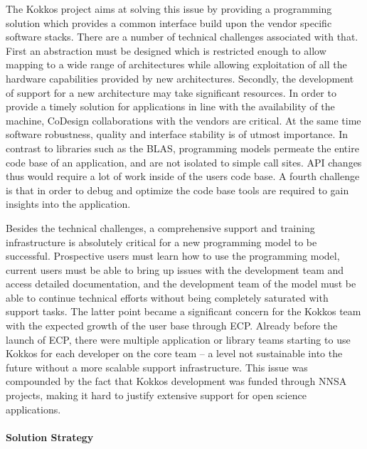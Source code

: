 The Kokkos project aims at solving this issue by providing a programming solution which provides a common interface build upon the vendor specific software stacks.
There are a number of technical challenges associated with that. 
First an abstraction must be designed which is restricted enough to allow mapping to a wide range of architectures while allowing exploitation of all the hardware capabilities provided by new architectures. 
Secondly, the development of support for a new architecture may take significant resources. In order to provide a timely solution for applications in line with the availability of the machine, CoDesign collaborations with the vendors are critical.
At the same time software robustness, quality and interface stability is of utmost importance. 
In contrast to libraries such as the BLAS, programming models permeate the entire code base of an application, and are not isolated to simple call sites. 
API changes thus would require a lot of work inside of the users code base. 
A fourth challenge is that in order to debug and optimize the code base tools are required to gain insights into the application. 

Besides the technical challenges, 
a comprehensive support and training infrastructure is absolutely critical for a new programming model to be successful.
Prospective users must learn how to use the programming model, current users must be able to bring up issues with the development team and access detailed documentation, and the development team of the model must be able to continue technical efforts without being completely saturated with support tasks. 
The latter point became a significant concern for the Kokkos team with the expected growth of the user base through ECP.  
Already before the launch of ECP, there were multiple application or library teams starting to use Kokkos for each developer on the core team -- a level not sustainable into the future without a more scalable support infrastructure. 
This issue was compounded by the fact that Kokkos development was funded through NNSA projects, making it hard to justify extensive support for open science applications. 

\paragraph{Solution Strategy}

